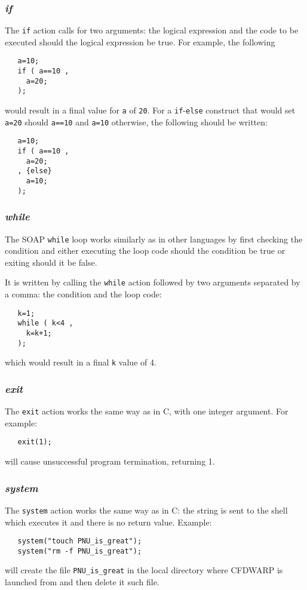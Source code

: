 \documentclass{warpdoc}
\begin{document}
\subsubsection{\emph{if}}

The \verb|if| action  calls for
two arguments: the logical expression and the code to
be executed should the logical expression be true.
For example, the following
%
\begin{verbatim}
   a=10;
   if ( a==10 ,
     a=20;
   );
\end{verbatim}
%
would result in a final value for \verb|a| of \verb|20|. For a \verb|if|-\verb|else| construct that would set \verb|a=20| should \verb|a==10| and \verb|a=10| otherwise, the following should be written:
%
\begin{verbatim}
   a=10;
   if ( a==10 ,
     a=20;
   , {else}
     a=10;
   );
\end{verbatim}
%


\subsubsection{\emph{while}}

The SOAP \verb|while| loop works similarly as in other languages
by first checking the condition and
either executing the loop code should the condition be true or exiting
should it be false.

It is written by calling the \verb|while| action followed by
two arguments separated by a comma: the condition and the loop code:
%
\begin{verbatim}
   k=1;
   while ( k<4 ,
     k=k+1;
   );
\end{verbatim}
%
which would result in a final \verb|k| value of 4.


\subsubsection{\emph{exit}}

The \verb|exit| action works the same way as in C, with one integer
argument. For example:
%
\begin{verbatim}
   exit(1);
\end{verbatim}
%
will cause unsuccessful program termination, returning 1.


\subsubsection{\emph{system}}

The \verb|system| action works the same way as in C: the string is sent to
the shell which executes it and there is no return value. Example:
%
\begin{verbatim}
   system("touch PNU_is_great");
   system("rm -f PNU_is_great");
\end{verbatim}
%
will create the file \verb|PNU_is_great| in the local directory where CFDWARP is launched from and then delete it such file. 
\end{document}

